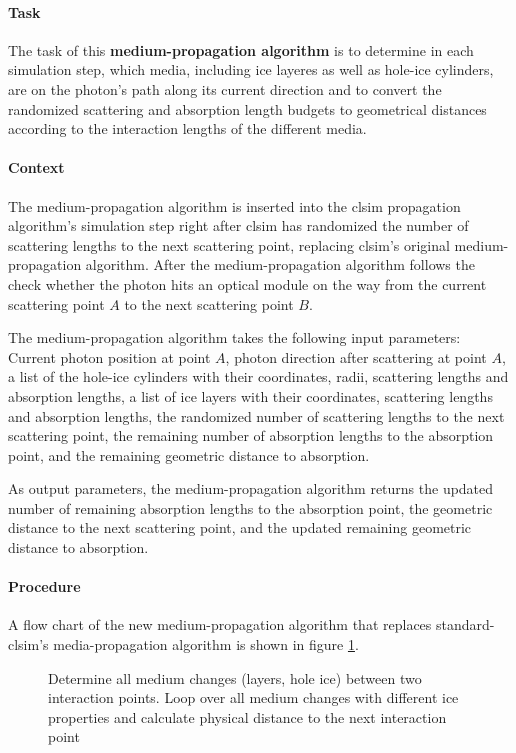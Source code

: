 \paragraph{Task}
The task of this \textbf{medium-propagation algorithm} is to determine in each simulation step, which media, including ice layeres as well as hole-ice cylinders, are on the photon's path along its current direction and to convert the randomized scattering and absorption length budgets to geometrical distances according to the interaction lengths of the different media.

\paragraph{Context}
The medium-propagation algorithm is inserted into the clsim propagation algorithm's simulation step right after clsim has randomized the number of scattering lengths to the next scattering point, replacing clsim's original medium-propagation algorithm. After the medium-propagation algorithm follows the check whether the photon hits an optical module on the way from the current scattering point $A$ to the next scattering point $B$.

The medium-propagation algorithm takes the following input parameters: Current photon position at point $A$, photon direction after scattering at point $A$, a list of the hole-ice cylinders with their coordinates, radii, scattering lengths and absorption lengths, a list of ice layers with their coordinates, scattering lengths and absorption lengths, the randomized number of scattering lengths to the next scattering point, the remaining number of absorption lengths to the absorption point, and the remaining geometric distance to absorption.

As output parameters, the medium-propagation algorithm returns the updated number of remaining absorption lengths to the absorption point, the geometric distance to the next scattering point, and the updated remaining geometric distance to absorption.

\paragraph{Procedure}
A flow chart of the new medium-propagation algorithm that replaces standard-clsim's media-propagation algorithm is shown in figure \ref{fig:iez4Geih}.

\begin{figure}[htbp]
  \caption{\todo{} Determine all medium changes (layers, hole ice) between two interaction points. Loop over all medium changes with different ice properties and calculate physical distance to the next interaction point}
  \label{fig:iez4Geih}
\end{figure}

